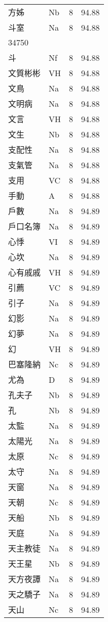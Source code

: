 \documentclass[twocolumn]{book}
\begin{document}
\begin{supertabular}{llrr}
方姊 & Nb & 8 &  94.88\\
斗室 & Na & 8 &  94.88\\
34750\\
斗 & Nf & 8 &  94.88\\
文質彬彬 & VH & 8 &  94.88\\
文鳥 & Na & 8 &  94.88\\
文明病 & Na & 8 &  94.88\\
文言 & VH & 8 &  94.88\\
文生 & Nb & 8 &  94.88\\
支配性 & Na & 8 &  94.88\\
支氣管 & Na & 8 &  94.88\\
支用 & VC & 8 &  94.88\\
手動 & A & 8 &  94.88\\
戶數 & Na & 8 &  94.89\\
戶口名簿 & Na & 8 &  94.89\\
心悸 & VI & 8 &  94.89\\
心坎 & Na & 8 &  94.89\\
心有戚戚 & VH & 8 &  94.89\\
引薦 & VC & 8 &  94.89\\
引子 & Na & 8 &  94.89\\
幻影 & Na & 8 &  94.89\\
幻夢 & Na & 8 &  94.89\\
幻 & VH & 8 &  94.89\\
巴塞隆納 & Nc & 8 &  94.89\\
尤為 & D & 8 &  94.89\\
孔夫子 & Nb & 8 &  94.89\\
孔 & Nb & 8 &  94.89\\
太監 & Na & 8 &  94.89\\
太陽光 & Na & 8 &  94.89\\
太原 & Nc & 8 &  94.89\\
太守 & Na & 8 &  94.89\\
天窗 & Na & 8 &  94.89\\
天朝 & Nc & 8 &  94.89\\
天船 & Nb & 8 &  94.89\\
天庭 & Na & 8 &  94.89\\
天主教徒 & Na & 8 &  94.89\\
天王星 & Nb & 8 &  94.89\\
天方夜譚 & Na & 8 &  94.89\\
天之驕子 & Na & 8 &  94.89\\
天山 & Nc & 8 &  94.89\\

\end{supertabular}
\end{document}
